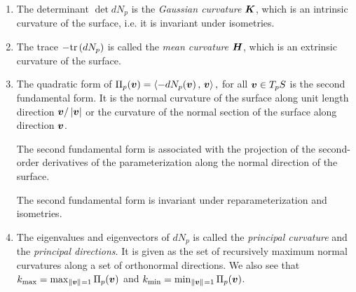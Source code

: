 \documentclass[11pt]{article}
\begin{document}
\begin{enumerate}
\item   \begin{definition}
The determinant $\det{dN_{p}}$  is the \emph{Gaussian curvature} $\boldsymbol{K}$, which is an intrinsic curvature of the surface, i.e. it is invariant under isometries. 
\end{definition} 

\item The trace $-\text{tr}\left(dN_{p}\right)$ is called the \emph{mean curvature} $\boldsymbol{H}$, which is an extrinsic curvature of the surface. 

\item The quadratic form of $\Pi_{p}(\boldsymbol{v}) = \left\langle -dN_{p}(\boldsymbol{v})\,,\, \boldsymbol{v} \right\rangle,$ for all $\boldsymbol{v}\in T_{p}S$ is the second fundamental form. It is the normal curvature of the surface along unit length direction $\boldsymbol{v}/\left\lvert \boldsymbol{v} \right\rvert$ or the curvature of the normal section of the surface along direction $\boldsymbol{v}$. 

The second fundamental form is associated with the projection of the second-order derivatives of the parameterization along the normal direction of the surface. 

The second fundamental form is invariant under reparameterization and isometries. 
 
%
 
\item \begin{definition}  The eigenvalues and eigenvectors of $dN_{p}$ is called the \emph{principal curvature} and the \emph{principal directions}. It is given as the set of recursively maximum normal curvatures along a set of orthonormal directions.  We also see that $k_{\max} = \max_{\left\|\boldsymbol{v}\right\|_{} = 1 }\Pi_{p}(\boldsymbol{v})$ and $k_{\min} = \min_{\left\|\boldsymbol{v}\right\|_{} = 1 }\Pi_{p}(\boldsymbol{v})$.
\end{definition} 


\end{enumerate}
\end{document}
